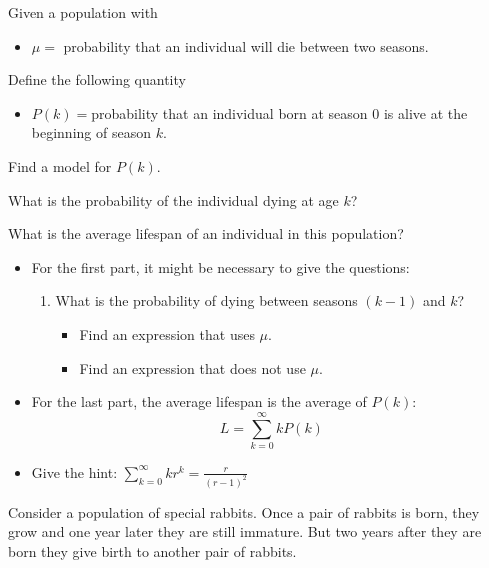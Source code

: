 	

\bookonlynewpage



\question
	Given a population with
	\begin{itemize}
		\item $\mu=$ probability that an individual will die between two seasons.
	\end{itemize}
\begin{parts}
	\item Define the following quantity
	\begin{itemize}
		\item $P(k)=$probability that an individual born at season $0$ is alive at the beginning of season $k$.
	\end{itemize}
	Find a model for $P(k)$.

	\item What is the probability of the individual dying at age $k$?
	\item What is the average lifespan of an individual in this population?
\end{parts}

\begin{annotation}
\begin{goals}
\begin{itemize}
	\item For the first part, it might be necessary to give the questions:
	\begin{enumerate}[label=(\alph*)]
		\item What is the probability of dying between seasons $(k-1)$ and $k$?
		\begin{itemize}
			\item Find an expression that uses $\mu$.
			\item Find an expression that does not use $\mu$.
		\end{itemize}
	\end{enumerate}
	\item For the last part, the average lifespan is the average of $P(k)$:
	$$ L = \sum_{k=0}^\infty k P(k) $$
	\item Give the hint: $\displaystyle \sum_{k=0}^\infty k r^k = \frac{r}{(r-1)^2}$
\end{itemize}	
\end{goals}
\end{annotation}



\bookonlynewpage


\question
	Consider a population of special rabbits. Once a pair of rabbits is born, they grow and one year later they are still immature. But two years after they are born they give birth to another pair of rabbits.
	
